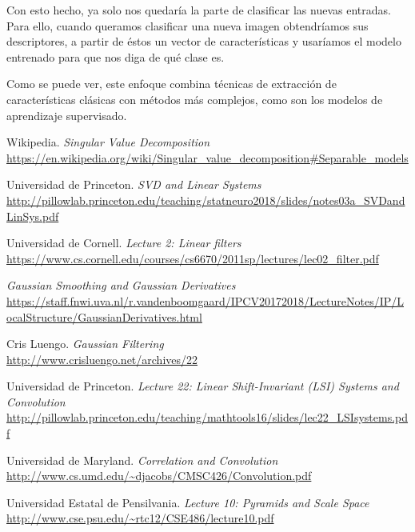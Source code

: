 \documentclass[11pt,a4paper]{article}
\begin{document}
Con esto hecho, ya solo nos quedaría la parte de clasificar las nuevas entradas. Para ello, cuando queramos clasificar una
nueva imagen obtendríamos sus descriptores, a partir de éstos un vector de características y usaríamos el modelo
entrenado para que nos diga de qué clase es.

Como se puede ver, este enfoque combina técnicas de extracción de características clásicas con métodos más complejos, como
son los modelos de aprendizaje supervisado.

\newpage

\begin{thebibliography}{20}

Wikipedia. \textit{Singular Value Decomposition}
\\\url{https://en.wikipedia.org/wiki/Singular_value_decomposition#Separable_models}

Universidad de Princeton. \textit{SVD and Linear Systems}
\\\url{http://pillowlab.princeton.edu/teaching/statneuro2018/slides/notes03a_SVDandLinSys.pdf}

Universidad de Cornell. \textit{Lecture 2: Linear filters}
\\\url{https://www.cs.cornell.edu/courses/cs6670/2011sp/lectures/lec02_filter.pdf}

\textit{Gaussian Smoothing and Gaussian Derivatives}
\\\url{https://staff.fnwi.uva.nl/r.vandenboomgaard/IPCV20172018/LectureNotes/IP/LocalStructure/GaussianDerivatives.html}

Cris Luengo. \textit{Gaussian Filtering}
\\\url{http://www.crisluengo.net/archives/22}

Universidad de Princeton. \textit{Lecture 22: Linear Shift-Invariant (LSI) Systems and Convolution}
\\\url{http://pillowlab.princeton.edu/teaching/mathtools16/slides/lec22_LSIsystems.pdf}

Universidad de Maryland. \textit{Correlation and Convolution}
\\\url{http://www.cs.umd.edu/~djacobs/CMSC426/Convolution.pdf}

Universidad Estatal de Pensilvania. \textit{Lecture 10: Pyramids and Scale Space}
\\\url{http://www.cse.psu.edu/~rtc12/CSE486/lecture10.pdf}


\end{thebibliography}
\end{document}
